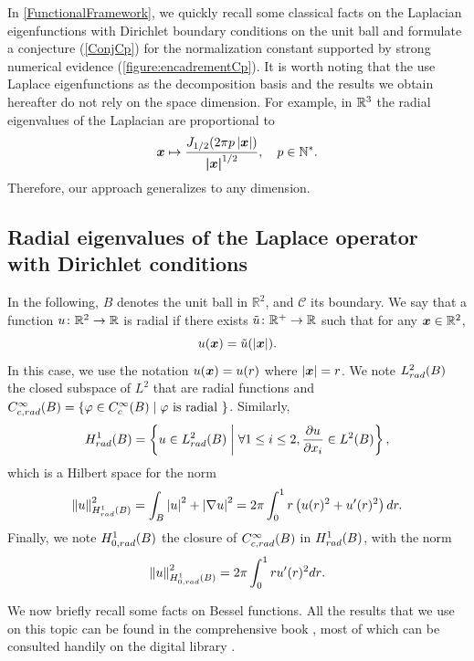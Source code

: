 \documentclass{article}
\begin{document}
In \autoref{FunctionalFramework}, we quickly recall some classical facts on the Laplacian eigenfunctions with Dirichlet boundary conditions on the unit ball and formulate a conjecture (\autoref{ConjCp}) for the normalization constant supported by strong numerical evidence (\autoref{figure:encadrementCp}). It is worth noting that the use Laplace eigenfunctions as the decomposition basis and the results we obtain hereafter do not rely on the space dimension. For example, in $\mathbb{R}^3$ the radial eigenvalues of the Laplacian are proportional to
\[  \boldsymbol{x} \mapsto \dfrac{J_{1/2}(2\pi p\left\lvert \boldsymbol{x} \right\rvert)}{\boldsymbol{|x|}^{1/2}}, \quad  p\in\mathbb{N}^*.\] 
Therefore, our approach generalizes \cite{Alouges2015} to any dimension.  
\subsection{Radial eigenvalues of the Laplace operator with Dirichlet conditions}
\label{FunctionalFramework}
In the following, $B$ denotes the unit ball in $\mathbb{R}^2$, and $\mathcal{C}$ its boundary. We say that a function $u\colon\mathbb{R}^2\rightarrow \mathbb{R}$ is radial if there exists $\tilde{u}\colon\mathbb{R}^+\to \mathbb{R}$ such that for any $\boldsymbol{x} \in \mathbb{R}^2$, 
\[ u(\boldsymbol{x}) = \tilde{u}(\left\lvert \boldsymbol{x} \right\rvert).\] 
In this case, we use the notation $u(\boldsymbol{x})= u(r)$ where $\left\lvert \boldsymbol{x} \right\rvert = r$. 
We note $L^2_{rad}(B)$ the closed subspace of $L^2$ that are radial functions and $C^\infty_{c,rad}(B) = \left\{\varphi \in C^{\infty}_c(B)\mathrel{}\middle|\mathrel{}\varphi \text{ is radial }\right\}$. Similarly,
\[H^1_{rad}(B) = \left\{ u \in L^2_{rad}(B)\mathrel{}\middle|\mathrel{} \forall 1 \leq i \leq 2, \dfrac{\partial u}{\partial x_i} \in L^2(B)\right\},\]
which is a Hilbert space for the norm
\[\left\|u\right\|_{H^1_{rad}(B)}^2 = \int_{B}\left\lvert u \right\rvert^2 + \left\lvert \nabla u \right\rvert^2 = 2\pi\int_{0}^1 r \left(u(r)^2 + u'(r)^2\right) dr. \]
Finally, we note $H^1_{0,rad}(B)$ the closure of $C^\infty_{c,rad}(B)$ in $H^1_{rad}(B)$, with the norm
\[\left\|u\right\|_{H^1_{0,rad}(B)}^2 = {2\pi \int_{0}^1 r u'(r)^2dr}.\] 

We now briefly recall some facts on Bessel functions. All the results that we use on this topic can be found in the comprehensive book \cite{abramowitz1964handbook}, most of which can be consulted handily on the digital library \cite{NIST:DLMF}.
\end{document}
